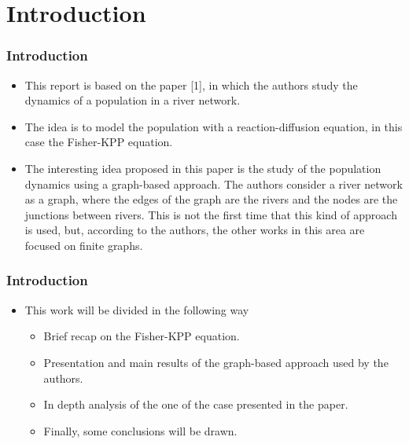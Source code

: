 \section{Introduction}


\begin{frame}
    \frametitle{Introduction}
    \begin{itemize}
        \item This report is based on the paper [1], in which the authors study the dynamics of a population in a river network.
        \item The idea is to model the population with a reaction-diffusion equation, in this case the Fisher-KPP equation. 
        \item The interesting idea proposed in this paper is the study of the population dynamics using a graph-based approach. The authors consider a river network as a graph, where the edges of the graph are the rivers and the nodes are the junctions between rivers. This is not the first time that this kind of approach is used, but, according to the authors, the other works in this area are focused on finite graphs.
    \end{itemize}
\end{frame}


\begin{frame}
    \frametitle{Introduction}
    \begin{itemize}
        \item This work will be divided in the following way
        \begin{itemize}
            \item Brief recap on the Fisher-KPP equation.
            \item Presentation and main results of the graph-based approach used by the authors.
            \item In depth analysis of the one of the case presented in the paper.
            \item Finally, some conclusions will be drawn.
        \end{itemize}
    \end{itemize}
\end{frame}

